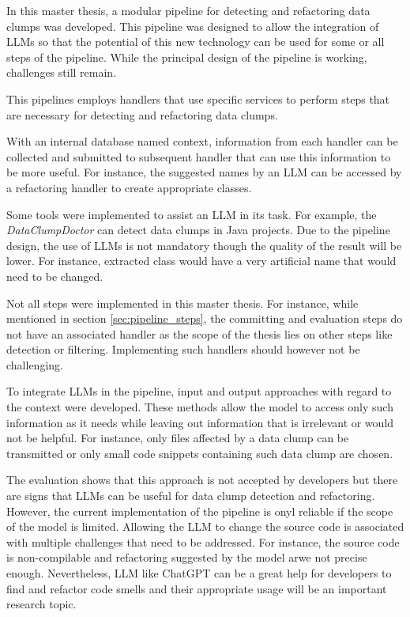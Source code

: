 In this master thesis, a modular pipeline for detecting and refactoring data clumps was developed. This pipeline was designed to allow the integration of \acp{LLM} so that the potential of this new technology can be used for some or all steps of the pipeline. While the principal design of the pipeline is working, challenges still remain.   


This pipelines employs handlers that use specific services to perform steps that are necessary for detecting and refactoring data clumps. 

With an internal database named context, information from each handler can be collected and submitted to subsequent handler that can use this information to be more useful. For instance, the suggested names by an \ac{LLM} can be accessed by a refactoring handler to create appropriate classes. 

Some tools were implemented to assist an \ac{LLM} in its task. For example, the \textit{DataClumpDoctor} can detect data clumps in Java projects. Due to the pipeline design, the use of \acp{LLM} is not mandatory though the quality of the result will be lower. For instance, extracted class would have a very artificial name that would need to be changed. 

Not all steps were implemented in this master thesis. For instance, while mentioned in section \ref{sec:pipeline_steps}, the committing and evaluation steps do not have an associated handler as the scope of the thesis lies on other steps like detection or filtering. Implementing such handlers should however not be challenging. 

To integrate \acp{LLM} in the pipeline, input and output approaches with regard to the context were developed. These methods allow the model to access only such information as it needs while leaving out information that is irrelevant or would not be helpful. For instance, only files affected by a data clump can be transmitted or only small code snippets containing such data  clump are chosen.

The evaluation shows that this approach is not accepted by developers but there are signs that \acp{LLM} can be useful for data clump detection and refactoring. However, the current implementation of the pipeline is onyl reliable if the scope of the model is limited. Allowing the \ac{LLM} to change the source code is associated with  multiple challenges that need to be addressed.  For instance, the source code is non-compilable and refactoring suggested by the model arwe not precise enough. Nevertheless, \ac{LLM} like ChatGPT can be a great help for developers to find and refactor code smells and their appropriate usage will be an important research topic. 

